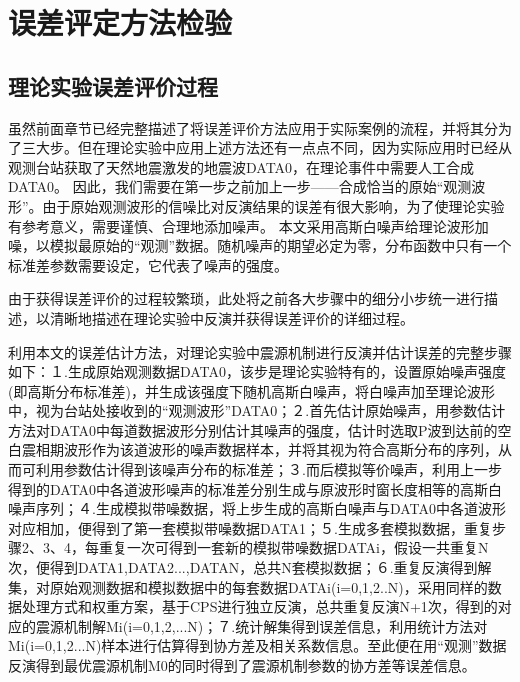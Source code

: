 \section{误差评定方法检验}

\subsection{理论实验误差评价过程}
虽然前面章节已经完整描述了将误差评价方法应用于实际案例的流程，并将其分为了三大步。但在理论实验中应用上述方法还有一点点不同，因为实际应用时已经从观测台站获取了天然地震激发的地震波DATA0，在理论事件中需要人工合成DATA0。
因此，我们需要在第一步之前加上一步——合成恰当的原始“观测波形”。由于原始观测波形的信噪比对反演结果的误差有很大影响，为了使理论实验有参考意义，需要谨慎、合理地添加噪声。
本文采用高斯白噪声给理论波形加噪，以模拟最原始的“观测”数据。随机噪声的期望必定为零，分布函数中只有一个标准差参数需要设定，它代表了噪声的强度。

由于获得误差评价的过程较繁琐，此处将之前各大步骤中的细分小步统一进行描述，以清晰地描述在理论实验中反演并获得误差评价的详细过程。

利用本文的误差估计方法，对理论实验中震源机制进行反演并估计误差的完整步骤如下：１.生成原始观测数据DATA0，该步是理论实验特有的，设置原始噪声强度(即高斯分布标准差)，并生成该强度下随机高斯白噪声，将白噪声加至理论波形中，视为台站处接收到的“观测波形”DATA0；２.首先估计原始噪声，用参数估计方法对DATA0中每道数据波形分别估计其噪声的强度，估计时选取P波到达前的空白震相期波形作为该道波形的噪声数据样本，并将其视为符合高斯分布的序列，从而可利用参数估计得到该噪声分布的标准差；３.而后模拟等价噪声，利用上一步得到的DATA0中各道波形噪声的标准差分别生成与原波形时窗长度相等的高斯白噪声序列；４.生成模拟带噪数据，将上步生成的高斯白噪声与DATA0中各道波形对应相加，便得到了第一套模拟带噪数据DATA1；５.生成多套模拟数据，重复步骤2、3、4，每重复一次可得到一套新的模拟带噪数据DATAi，假设一共重复N次，便得到DATA1,DATA2...,DATAN，总共N套模拟数据；６.重复反演得到解集，对原始观测数据和模拟数据中的每套数据DATAi(i=0,1,2..N)，采用同样的数据处理方式和权重方案，基于CPS进行独立反演，总共重复反演N+1次，得到的对应的震源机制解Mi(i=0,1,2,...N)；７.统计解集得到误差信息，利用统计方法对Mi(i=0,1,2...N)样本进行估算得到协方差及相关系数信息。至此便在用“观测”数据反演得到最优震源机制M0的同时得到了震源机制参数的协方差等误差信息。

